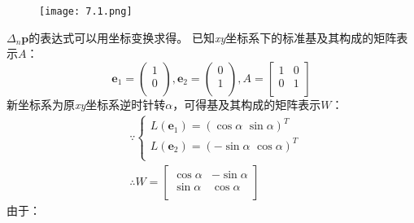 \begin{figure}[h]
\centering
\texttt{[image: 7.1.png]}
\end{figure}

$\Delta _n\boldsymbol{p}$的表达式可以用坐标变换求得。
已知{\it xy}坐标系下的标准基及其构成的矩阵表示$A$：
\[
\boldsymbol{e}_1=\left( \begin{array}{c}
	1\\
	0\\
\end{array} \right) ,\boldsymbol{e}_2=\left( \begin{array}{c}
	0\\
	1\\
\end{array} \right) ,A=\left[ \begin{matrix}
	1&		0\\
	0&		1\\
\end{matrix} \right]
\]
新坐标系为原{\it xy}坐标系逆时针转$\alpha $，可得基及其构成的矩阵表示$W$：
\begin{align*}
&\because \begin{cases}
	L\left( \boldsymbol{e}_1 \right) =\left( \cos \alpha \,\,\sin \alpha \right) ^T\\
	L\left( \boldsymbol{e}_2 \right) =\left( -\sin \alpha \,\,\cos \alpha \right) ^T\\
\end{cases} \\
&\therefore W=\left[ \begin{matrix}
	\cos \alpha&		-\sin \alpha\\
	\sin \alpha&		\cos \alpha\\
\end{matrix} \right]
\end{align*}
由于：
